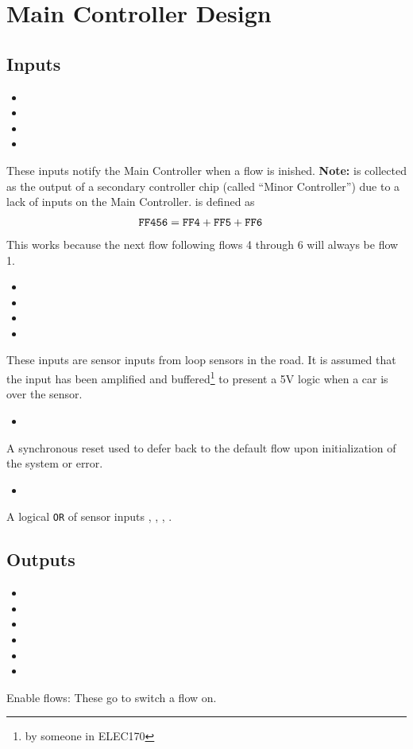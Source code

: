 \section{Main Controller Design}
\subsection{Inputs}
\begin{itemize}
  \item {}
  \item {}
  \item {}
  \item {}
\end{itemize}
These inputs notify the Main Controller when a flow is inished. \textbf{Note:}
 is collected as the output of a secondary controller chip (called
``Minor Controller'') due to a lack of inputs on the Main Controller. 
is defined as
\begin{align}\texttt{FF456} &= \texttt{FF4} + \texttt{FF5} + \texttt{FF6}\end{align}
This works because the next flow following flows 4 through 6 will always be flow
1.

\begin{itemize}
  \item \AR
  \item \B
  \item \CR
  \item \D
\end{itemize}
These inputs are sensor inputs from loop sensors in the road. It is assumed that
the input has been amplified and buffered\footnote{by someone in ELEC170} to
present a 5V logic \HIGH when a car is over the sensor.
\begin{itemize}
  \item \nReset
\end{itemize}
A synchronous reset used to defer back to the default flow upon initialization
of the system or error.
\begin{itemize}
  \item \nS
\end{itemize}
A logical \texttt{OR} of sensor inputs \AR, \B, \CR, \D.

\subsection{Outputs}
\begin{itemize}
  \item {}
  \item {}
  \item {}
  \item {}
  \item {}
  \item {}
\end{itemize}
Enable flows: These go \HIGH to switch a flow on.

